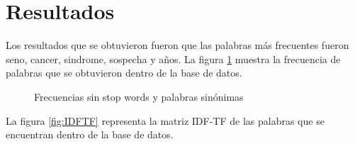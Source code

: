 \section{Resultados}

Los resultados que se obtuvieron fueron que las palabras más frecuentes fueron seno, cancer, sindrome, sospecha y años. La figura \ref{fig:sin} muestra la frecuencia de palabras que se obtuvieron dentro de la base de datos.

\begin{figure}[H]
	\centering
	\caption{Frecuencias sin stop words y palabras sinónimas} \label{fig:sin}
\end{figure} 

La figura \ref{fig:IDFTF} representa la matriz IDF-TF de las palabras que se encuentran dentro de la base de datos.  

